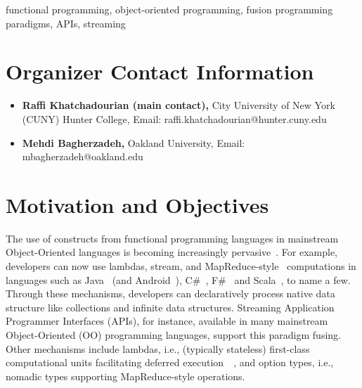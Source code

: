 \documentclass[10pt, conference]{IEEEtran}
\begin{document}
\maketitle

\begin{abstract}
	
\end{abstract}


\begin{IEEEkeywords}
	functional programming, object-oriented programming, fusion programming paradigms, APIs, streaming
\end{IEEEkeywords}

\section{Organizer Contact Information}

\begin{itemize}
	\item \textbf{Raffi Khatchadourian (main contact),} City University of New York (CUNY) Hunter College, Email: raffi.khatchadourian@hunter.cuny.edu
	\item \textbf{Mehdi Bagherzadeh,} Oakland University, Email: mbagherzadeh@oakland.edu
\end{itemize}

\section{Motivation and Objectives}

The use of constructs from functional programming languages in mainstream Object-Oriented languages is becoming increasingly pervasive~\cite{Biboudis2015}. For example, developers can now use lambdas, stream, and MapReduce-style~\cite{Dean2008} computations in languages such as Java~\cite{OracleCorporation2017} (and Android~\cite{Lau2017}), C\#~\cite{Microsoft2018}, F\#~\cite{fsharp} and Scala~\cite{Lausanne2015}, to name a few. Through these mechanisms, developers can declaratively process native data structure like collections and infinite data structures. Streaming Application Programmer Interfaces (APIs), for instance, available in many mainstream Object-Oriented (OO) programming languages, support this paradigm fusing. Other mechanisms include lambdas, i.e., (typically stateless) first-class computational units facilitating deferred execution~~\cite{OracleCorporation2015,Wagner2017}, and option types, i.e., nomadic types supporting MapReduce-style operations.
\end{document}
